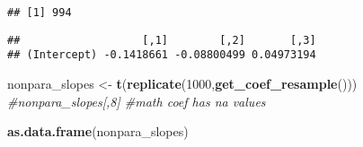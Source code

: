 \documentclass[
]{article}
\newenvironment{Shaded}{\begin{snugshade}}{\end{snugshade}}
\newcommand{\CommentTok}[1]{\textcolor[rgb]{0.56,0.35,0.01}{\textit{#1}}}
\newcommand{\DecValTok}[1]{\textcolor[rgb]{0.00,0.00,0.81}{#1}}
\newcommand{\KeywordTok}[1]{\textcolor[rgb]{0.13,0.29,0.53}{\textbf{#1}}}
\newcommand{\NormalTok}[1]{#1}
\newcommand{\OperatorTok}[1]{\textcolor[rgb]{0.81,0.36,0.00}{\textbf{#1}}}
\newcommand{\StringTok}[1]{\textcolor[rgb]{0.31,0.60,0.02}{#1}}
\begin{document}
\begin{verbatim}
## [1] 994
\end{verbatim}

\begin{Shaded}
\end{Shaded}

\begin{verbatim}
##                   [,1]        [,2]       [,3]
## (Intercept) -0.1418661 -0.08800499 0.04973194
\end{verbatim}

\begin{Shaded}
\begin{Highlighting}[]
\NormalTok{nonpara_slopes <-}\StringTok{ }\KeywordTok{t}\NormalTok{(}\KeywordTok{replicate}\NormalTok{(}\DecValTok{1000}\NormalTok{,}\KeywordTok{get_coef_resample}\NormalTok{()))}
\CommentTok{#nonpara_slopes[,8] #math coef has na values}

\KeywordTok{as.data.frame}\NormalTok{(nonpara_slopes)}
\end{Highlighting}
\end{Shaded}
\end{document}
